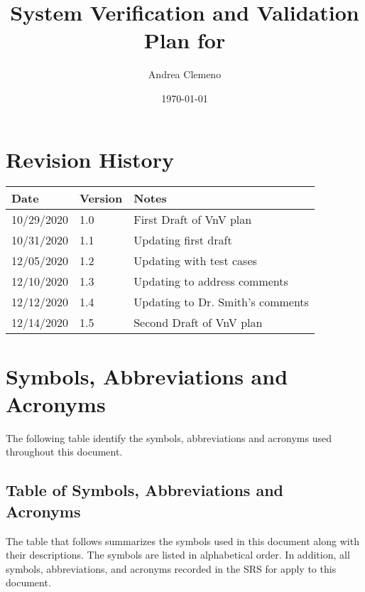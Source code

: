 \documentclass[12pt, titlepage]{article}
\begin{document}
\title{System Verification and Validation 
Plan for \progname{}} 
\author{Andrea Clemeno}
\date{\today}
	
\maketitle


\section{Revision History}

\begin{tabularx}{\textwidth}{p{3cm}p{2cm}X}
\toprule {\bf Date} & {\bf Version} & {\bf Notes}\\
\midrule
10/29/2020  & 1.0 & First Draft of VnV plan\\
10/31/2020  & 1.1 & Updating first draft\\
12/05/2020  & 1.2 & Updating with test cases\\
12/10/2020  & 1.3 & Updating to address comments\\
12/12/2020  & 1.4 & Updating to Dr. Smith's comments\\
12/14/2020  & 1.5 & Second Draft of VnV plan\\
\bottomrule
\end{tabularx}


\newpage

\tableofcontents
\newpage
\listoftables
\newpage

\newpage

\section{Symbols, Abbreviations and Acronyms}

The following table identify the symbols, abbreviations and acronyms used 
throughout this document.
  
\subsection{Table of Symbols, Abbreviations and Acronyms}

The table that follows summarizes the symbols used in this document along with
their descriptions. The symbols are listed in alphabetical order. In addition, 
all symbols, abbreviations, and acronyms recorded in the SRS for \progname{} 
\citep{SRS} apply to this document.
\end{document}
